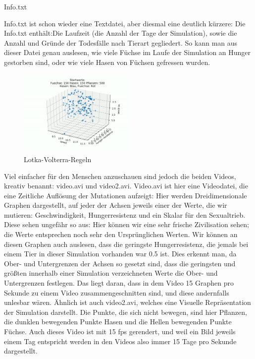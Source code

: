 \documentclass[12pt]{article}
\begin{document}
Info.txt
    
    Info.txt ist schon wieder eine Textdatei, aber diesmal eine deutlich kürzere:
        Die Info.txt enthält:Die Laufzeit (die Anzahl der Tage der
        Simulation), sowie die Anzahl und Gründe der Todesfälle nach Tierart gegliedert. So kann man aus dieser Datei genau auslesen, wie viele Füchse im Laufe
        der Simulation an Hunger gestorben sind, oder wie viele Hasen von Füchsen
gefressen wurden.
\newpage
\begin{figure}
        \centering
        \includegraphics[width=0.5\textwidth]{stillframe.PNG}
        \caption{Lotka-Volterra-Regeln \label{overflow}}
\end{figure}

Viel einfacher für den Menschen anzuschauen sind jedoch die beiden Videos, kreativ benannt: video.avi und video2.avi. Video.avi ist hier eine Videodatei, die eine Zeitliche Auflösung der Mutationen aufzeigt: Hier werden Dreidimensionale Graphen dargestellt, auf jeder der Achsen jeweils einer der Werte, die wir mutieren: Geschwindigkeit, Hungerresistenz und ein
        Skalar für den Sexualtrieb. Diese sehen ungefähr
        so aus:
        Hier können wir eine sehr frische Zivilisation
        sehen; die Werte entsprechen noch sehr den
        Ursprünglichen Werten. Wir können an diesen
        Graphen auch auslesen, dass die geringste
        Hungerresistenz, die jemals bei einem Tier in
        dieser Simulation vorhanden war 0.5 ist. Dies
        erkennt man, da Ober- und Untergrenzen der
        Achsen so gesetzt sind, dass die geringsten und größten innerhalb einer Simulation
        verzeichneten Werte die Ober- und Untergrenzen festlegen. Das liegt daran, dass in
        dem Video 15 Graphen pro Sekunde zu einem Video zusammengeschnitten sind, und
        diese andernfalls unlesbar wären.
        Ähnlich ist auch video2.avi, welches eine Visuelle Repräsentation der Simulation
        darstellt. Die Punkte, die sich nicht bewegen, sind hier Pflanzen, die dunklen
        bewegenden Punkte Hasen und die Hellen bewegenden Punkte Füchse. Auch dieses
        Video ist mit 15 fps gerendert, und weil ein Bild jeweils einem Tag entspricht
        werden in den Videos also immer 15 Tage pro Sekunde dargestellt.
\end{document}
